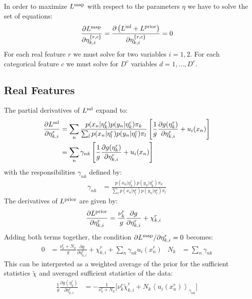 \documentclass[a4paper,fleqn,10pt,openright,oldfontcommands]{memoir}
\newcommand{\pd}{\partial}
\newcommand{\pdff}[2]{\frac{\partial #1}{\partial #2}}
\newcommand{\ev}[1]{\left\langle #1 \right\rangle}
\begin{document}
In order to maximize $L^{\rm map}$ with respect to the parameters $\eta$ we have to solve the set of equations:
\[
  \pdff{L^{\rm map}}{\eta^{\{r,c\}}_{k,i}}  %
  = \pdff{\left( L^{\rm ml} + L^{\rm prior} \right)}{\eta^{\{r,c\}}_{k,i}} %
  = 0
\]
For each real feature $r$ we must solve for two variables $i = {1, 2}$. For each categorical feature $c$ we must solve for $D^c$ variables $d = {1, \ldots, D^c}$. 

\subsection*{Real Features}

The partial derivatives of $L^{\rm ml}$ expand to:
\begin{align*}
	\pdff{L^{\rm ml}}{\eta_{k,i}^r}
	  &= \sum_n \frac{p(x_n | \eta_k^r) p(y_n | \eta_k^c) \pi_k} %
	                 {\sum_l p(x_n | \eta_l^r) p(y_n | \eta_l^c) \pi_l}
	            \left[
	            	\frac{1}{g}\pdff{g(\eta_k^r)}{\eta_{k,i}^r}
	            	+ u_i(x_n)
	            \right] \\     
	  &= \sum_n \gamma_{nk}
	            \left[
	            	\frac{1}{g} \pdff{g(\eta_k^r)}{\eta_{k,i}^r}
	            	+ u_i(x_n)
	            \right]
\end{align*}
with the responsibilities $\gamma_{nk}$ defined by:
\begin{align*}
    \gamma_{nk}
      &= \frac{p(x_n | \eta_k^r) p(y_n | \eta_k^c) \pi_k}
              {\sum_l p(x_n | \eta_l^r) p(y_n | \eta_l^c) \pi_l}
\end{align*}
The derivatives of $L^{\rm prior}$ are given by:
\begin{align*}
    \pdff{L^{\rm prior}}{\eta_{k,i}^r}
    &= \frac{\nu_k^r}{g} \pdff{g}{\eta_{k,i}^r} + \chi_{k,i}^r
\end{align*}
Adding both terms together, the condition $\pd L^{\rm map} / \pd \eta_{k,i}^r = 0$ becomes:
\begin{align*}
    0
    &=
      \frac{\nu_k^r + N_k}{g} \pdff{g}{\eta_{k,i}^r} 
      + \chi_{k,i}^r 
      + \sum_n \gamma_{nk} u_i(x_n^r)  &
    N_k
    &= \sum_n \gamma_{nk}
\end{align*}
This can be interpreted as a weighted average of the prior for the sufficient statistics $\tilde \chi$ and averaged sufficient statistics of the data:
\begin{align*}
	  \frac{1}{g}\pdff{g(\eta_k^r)}{\eta_{k,i}^r}
	  &= -\frac{1}{\nu_k^r + N_k} 
         \Big[
           \nu_k^r \tilde{\chi}_{k,i}^r 
           + N_k \ev{u_i(x_n^r)}_{\gamma_{nk}} 
         \Big] 
\end{align*}
\end{document}
